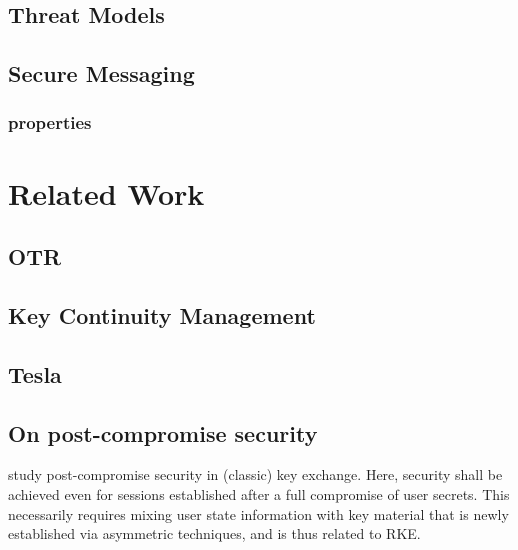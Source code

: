 \subsection{Threat Models}

\subsection{Secure Messaging}
	
	\subsubsection{properties}
\section{Related Work}
	\subsection{OTR}
	\subsection{Key Continuity Management}
	\subsection{Tesla}
	\subsection{On post-compromise security}
	study post-compromise security 	in (classic) key exchange. Here, security shall be achieved even for sessions established after a full compromise of user secrets. This necessarily requires mixing user state information with key material that is newly established via asymmetric techniques, and is thus related to RKE.